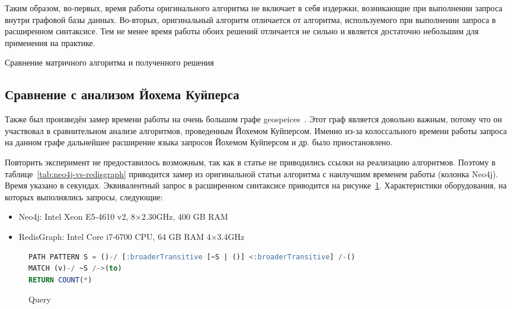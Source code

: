 Таким образом, во-первых, время работы оригинального алгоритма не включает в себя издержки, возникающие при выполнении запроса внутри графовой базы данных. Во-вторых, оригинальный алгоритм отличается от алгоритма, используемого при выполнении запроса в расширенном синтаксисе. Тем не менее время работы обоих решений отличается не сильно и является достаточно небольшим для применения на практике.
\begin{table}[h!]
\begin{adjustbox}{max width=\textwidth}

\end{adjustbox}
\caption{Сравнение матричного алгоритма и полученного решения}
\label{tab:combinators_vs_redisgraph}
\end{table}

\subsection{Сравнение с анализом Йохема Куйперса}
Также был произведён замер времени работы на очень большом графе geospeices~\cite{geospices}. Этот граф является довольно важным, потому что он участвовал в сравнительном анализе алгоритмов, проведенным Йохемом Куйперсом. Именно из-за колоссального времени работы запроса на данном графе дальнейшее расширение языка запросов Йохемом Куйперсом и др. было приостановлено. 

Повторить эксперимент не предоставилось возможным, так как в статье не приводились ссылки на реализацию алгоритмов. Поэтому в таблице~\ref{tab:neo4j-vs-redisgraph} приводится замер из оригинальной статьи алгоритма с наилучшим временем работы (колонка Neo4j). Время указано в секундах. Эквивалентный запрос в расширенном синтаксисе приводится на рисунке~\ref{code:broaderTransitive}. Характеристики оборудования, на которых выполнялись запросы, следующие:

\begin{itemize}
    \item Neo4j: Intel Xeon E5-4610 v2, 8$\times$2.30GHz, 400 GB RAM
    \item RedisGraph: Intel Core i7-6700 CPU, 64 GB RAM 4$\times$3.4GHz
\end{itemize}

\begin{figure}[h!]
\begin{adjustbox}{max width=\textwidth}
\begin{lstlisting}[language=sql]
PATH PATTERN S = ()-/ [:broaderTransitive [~S | ()] <:broaderTransitive] /-()
MATCH (v)-/ ~S /->(to)
RETURN COUNT(*)
\end{lstlisting}
\end{adjustbox}
\caption{Query}
\label{code:broaderTransitive}
\end{figure}

